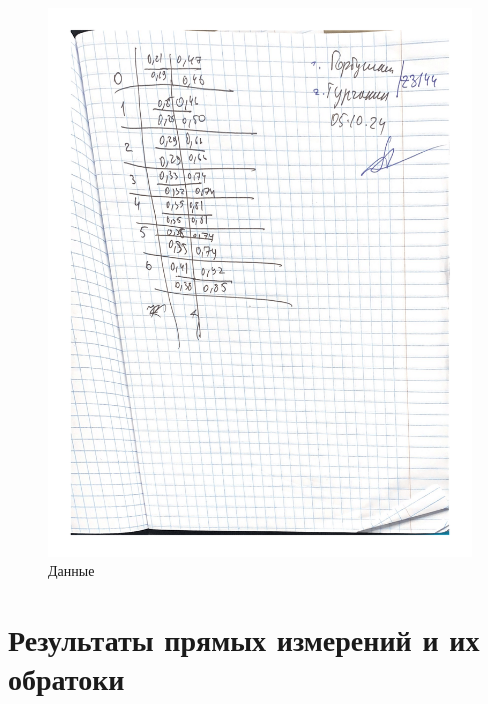 \documentclass[a4paper]{article}
\begin{document}
\begin{figure}[H]
\includegraphics[width=\textwidth, scale=0.5]{1-4.png}
\caption{Данные}
\end{figure}


\section{\bf{Результаты прямых измерений и их обратоки}}
\end{document}

